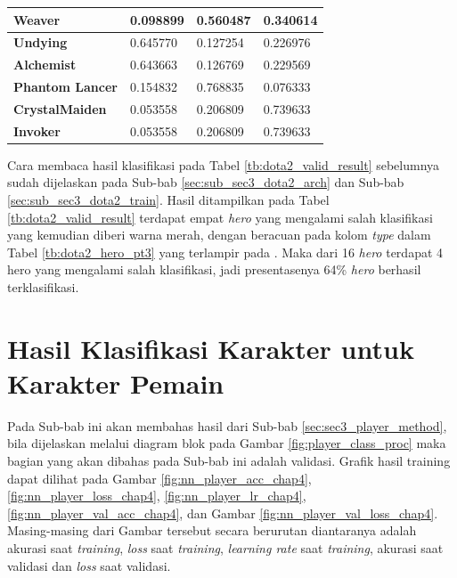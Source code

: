 \begin{longtable}{|l|l|l|l|}
	\rowcolor[HTML]{FFFFFF} 
	\textbf{Weaver} & 0.098899 & {\color[HTML]{036400} 0.560487} & 0.340614 \\ \hline
	\rowcolor[HTML]{FFFFFF} 
	\textbf{Undying} & {\color[HTML]{036400} 0.645770} & 0.127254 & 0.226976 \\ \hline
	\rowcolor[HTML]{FFFFFF} 
	\textbf{Alchemist} & {\color[HTML]{036400} 0.643663} & 0.126769 & 0.229569 \\ \hline
	\rowcolor[HTML]{FFFFFF} 
	\textbf{Phantom Lancer} & 0.154832 & {\color[HTML]{036400} 0.768835} & 0.076333 \\ \hline
	\rowcolor[HTML]{FFFFFF} 
	\textbf{CrystalMaiden} & 0.053558 & 0.206809 & {\color[HTML]{036400} 0.739633} \\ \hline
	\rowcolor[HTML]{FFFFFF} 
	\textbf{Invoker} & 0.053558 & 0.206809 & {\color[HTML]{036400} 0.739633} \\ \hline
\end{longtable}

Cara membaca hasil klasifikasi pada Tabel \ref{tb:dota2_valid_result} sebelumnya sudah dijelaskan pada Sub-bab \ref{sec:sub_sec3_dota2_arch} dan Sub-bab \ref{sec:sub_sec3_dota2_train}. Hasil ditampilkan pada Tabel \ref{tb:dota2_valid_result} terdapat empat \textit{hero} yang mengalami salah klasifikasi yang kemudian diberi warna merah, dengan beracuan pada kolom \textit{type} dalam Tabel \ref{tb:dota2_hero_pt3} yang terlampir pada . Maka dari 16 \textit{hero} terdapat 4 hero yang mengalami salah klasifikasi, jadi presentasenya 64\% \textit{hero} berhasil terklasifikasi.
\vspace{1ex}

\section{Hasil Klasifikasi Karakter untuk Karakter Pemain}
\label{sec:sec4_eval_player}
\vspace{1ex}

Pada Sub-bab ini akan membahas hasil dari Sub-bab \ref{sec:sec3_player_method}, bila dijelaskan melalui diagram blok pada Gambar \ref{fig:player_class_proc} maka bagian yang akan dibahas pada Sub-bab ini adalah validasi. Grafik hasil training dapat dilihat pada Gambar \ref{fig:nn_player_acc_chap4}, \ref{fig:nn_player_loss_chap4}, \ref{fig:nn_player_lr_chap4}, \ref{fig:nn_player_val_acc_chap4}, dan Gambar \ref{fig:nn_player_val_loss_chap4}. Masing-masing dari Gambar tersebut secara berurutan diantaranya adalah akurasi saat \textit{training}, \textit{loss} saat \textit{training}, \textit{learning rate} saat \textit{training}, akurasi saat validasi dan \textit{loss} saat validasi.
\vspace{2ex}

